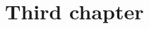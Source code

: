 \documentclass[../phdthesis]{subfiles}
\begin{document}
\chapter{Third chapter}
\label{chapter3}

\ifSubfilesClassLoaded{
	\printbibliography
}{}
\end{document}
